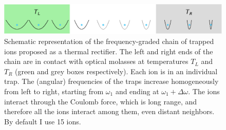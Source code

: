\begin{figure}
    \center
    \includegraphics[width=0.75\linewidth]{Figures/Diagram.eps}
    \caption{Schematic representation  of the frequency-graded chain of trapped ions proposed as a thermal rectifier. The left and right ends of the chain are in contact with optical molasses at temperatures $T_L$ and $T_R$ (green and grey boxes respectively). Each ion is in an individual trap. The (angular) frequencies of the traps increase homogeneously from left to right, starting from $\omega_1$ and ending at $\omega_1+\Delta\omega$. The ions interact through the Coulomb force, which is long range, and therefore all the ions interact among them, even distant neighbors. By default  I use 15 ions.}
    \label{fig:Diagram}
\end{figure}

